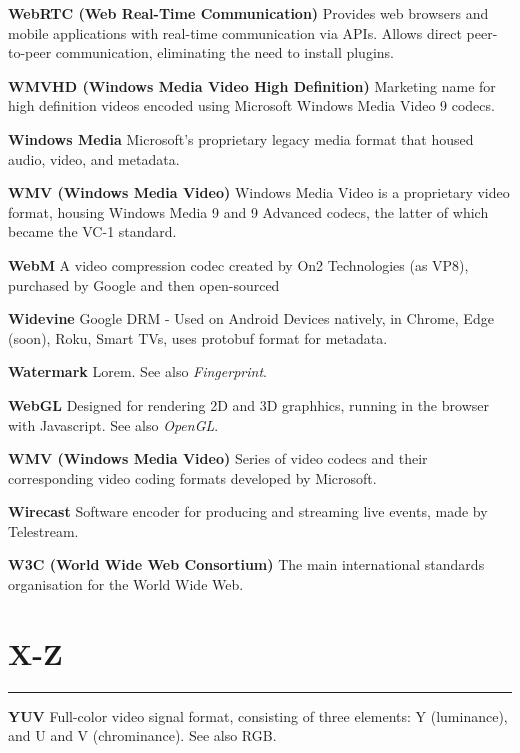 \medskip
\textbf{WebRTC (Web Real-Time Communication)}
Provides web browsers and mobile applications with real-time communication via APIs. Allows direct peer-to-peer communication, eliminating the need to install plugins.

\smallskip
\textbf{WMVHD (Windows Media Video High Definition)}
Marketing name for high definition videos encoded using Microsoft Windows Media Video 9 codecs.

\smallskip
\textbf{Windows Media}
Microsoft's proprietary legacy media format that housed audio, video, and metadata.

\smallskip
\textbf{WMV (Windows Media Video)}
Windows Media Video is a proprietary video format, housing Windows Media 9 and 9 Advanced codecs, the latter of which became the VC-1 standard.

\smallskip
\textbf{WebM}
A video compression codec created by On2 Technologies (as VP8), purchased by Google and then open-sourced

\smallskip
\textbf{Widevine}
Google DRM - Used on Android Devices natively, in Chrome, Edge (soon), Roku, Smart TVs, uses protobuf format for metadata.

\smallskip
\textbf{Watermark}
Lorem. See also \textit{Fingerprint}.

\smallskip
\textbf{WebGL}
Designed for rendering 2D and 3D graphhics, running in the browser with Javascript. See also \textit{OpenGL}.

\smallskip
\textbf{WMV (Windows Media Video)}
Series of video codecs and their corresponding video coding formats developed by Microsoft.

\smallskip
\textbf{Wirecast}
Software encoder for producing and streaming live events, made by Telestream.

\smallskip
\textbf{W3C (World Wide Web Consortium)}
The main international standards organisation for the World Wide Web.

\section{X-Z}
\hrule

\medskip
\textbf{YUV}
Full-color video signal format, consisting of three elements: Y (luminance), and U and V (chrominance). See also RGB.
